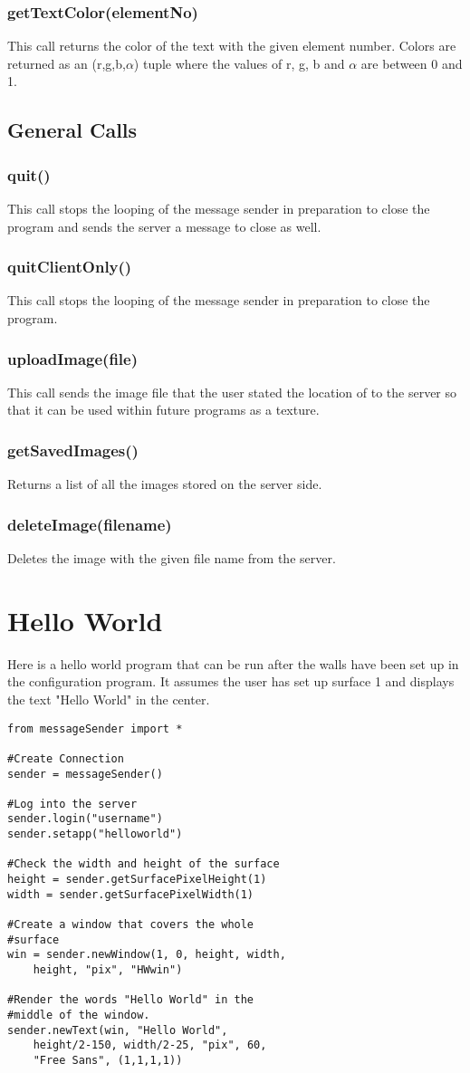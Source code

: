 \documentclass{acm_proc_article-sp}
\begin{document}
\subsubsection{getTextColor(elementNo)}
This call returns the color of the text with the given element number. Colors are returned as an (r,g,b,$\alpha$) tuple where the values of r, g, b and $\alpha$ are between 0 and 1.
\subsection{General Calls}
\subsubsection{quit()}
This call stops the looping of the message sender in preparation to close the program and sends the server a message to close as well.
\subsubsection{quitClientOnly()}
This call stops the looping of the message sender in preparation to close the program.
\subsubsection{uploadImage(file)}
This call sends the image file that the user stated the location of to the server so that it can be used within future programs as a texture.
\subsubsection{getSavedImages()}
Returns a list of all the images stored on the server side.
\subsubsection{deleteImage(filename)}
Deletes the image with the given file name from the server.
\section{Hello World}
Here is a hello world program that can be run after the walls have been set up in the configuration program. It assumes the user has set up surface 1 and displays the text "Hello World" in the center.
\lstset{language=Python}
\begin{lstlisting}[frame=single]
from messageSender import *

#Create Connection
sender = messageSender()

#Log into the server
sender.login("username")
sender.setapp("helloworld")

#Check the width and height of the surface
height = sender.getSurfacePixelHeight(1)
width = sender.getSurfacePixelWidth(1)

#Create a window that covers the whole 
#surface
win = sender.newWindow(1, 0, height, width, 
	height, "pix", "HWwin")
	
#Render the words "Hello World" in the 
#middle of the window.
sender.newText(win, "Hello World", 
	height/2-150, width/2-25, "pix", 60, 
	"Free Sans", (1,1,1,1))
\end{lstlisting}
\end{document}
